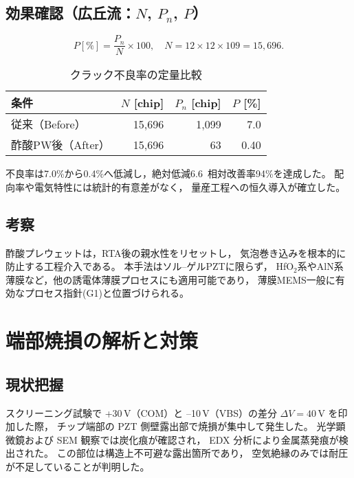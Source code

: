\documentclass[conference]{IEEEtran}
\begin{document}
\subsection{効果確認（広丘流：$N$, $P_n$, $P$）}
\[
  P[\%] = \frac{P_n}{N} \times 100, \quad
  N = 12\times12\times109 = 15{,}696.
\]

\begin{table}[h]
  \centering
  \caption{クラック不良率の定量比較}
  \label{tab:crack-yield}
  \setlength{\tabcolsep}{4pt}
  \begin{tabular}{@{}lrrr@{}}
    \toprule
    条件 & $N$ [chip] & $P_n$ [chip] & $P$ [\%] \\
    \midrule
    従来（Before） & 15{,}696 & 1{,}099 & 7.0 \\
    酢酸PW後（After） & 15{,}696 & 63 & 0.40 \\
    \bottomrule
  \end{tabular}
\end{table}

不良率は7.0\%から0.4\%へ低減し，絶対低減6.6\,%
相対改善率94\%を達成した。
配向率や電気特性には統計的有意差がなく，
量産工程への恒久導入が確立した。

\subsection{考察}
酢酸プレウェットは，RTA後の親水性をリセットし，
気泡巻き込みを根本的に防止する工程介入である。
本手法はソル–ゲルPZTに限らず，
HfO$_2$系やAlN系薄膜など，他の誘電体薄膜プロセスにも適用可能であり，
薄膜MEMS一般に有効なプロセス指針(G1)と位置づけられる。

\section{端部焼損の解析と対策}
\label{sec:burnout}

\subsection{現状把握}
スクリーニング試験で +30\,V（COM）と --10\,V（VBS）の差分
$\Delta V = 40\,\mathrm{V}$ を印加した際，
チップ端部の PZT 側壁露出部で焼損が集中して発生した。
光学顕微鏡および SEM 観察では炭化痕が確認され，
EDX 分析により金属蒸発痕が検出された。
この部位は構造上不可避な露出箇所であり，
空気絶縁のみでは耐圧が不足していることが判明した。
\end{document}

